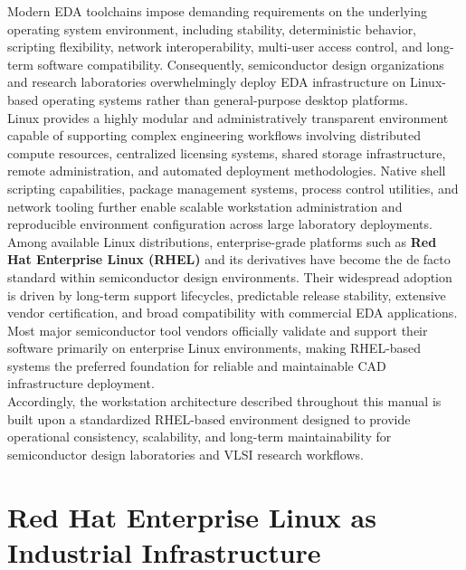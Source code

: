 Modern EDA toolchains impose demanding requirements on the underlying operating system environment, including stability, deterministic behavior, scripting flexibility, network interoperability, multi-user access control, and long-term software compatibility. Consequently, semiconductor design organizations and research laboratories overwhelmingly deploy EDA infrastructure on Linux-based operating systems rather than general-purpose desktop platforms.\\

Linux provides a highly modular and administratively transparent environment capable of supporting complex engineering workflows involving distributed compute resources, centralized licensing systems, shared storage infrastructure, remote administration, and automated deployment methodologies. Native shell scripting capabilities, package management systems, process control utilities, and network tooling further enable scalable workstation administration and reproducible environment configuration across large laboratory deployments.\\

Among available Linux distributions, enterprise-grade platforms such as \textbf{Red Hat Enterprise Linux (RHEL)} and its derivatives have become the de facto standard within semiconductor design environments. Their widespread adoption is driven by long-term support lifecycles, predictable release stability, extensive vendor certification, and broad compatibility with commercial EDA applications. Most major semiconductor tool vendors officially validate and support their software primarily on enterprise Linux environments, making RHEL-based systems the preferred foundation for reliable and maintainable CAD infrastructure deployment.\\

Accordingly, the workstation architecture described throughout this manual is built upon a standardized RHEL-based environment designed to provide operational consistency, scalability, and long-term maintainability for semiconductor design laboratories and VLSI research workflows.\\


\section{Red Hat Enterprise Linux as Industrial Infrastructure}

